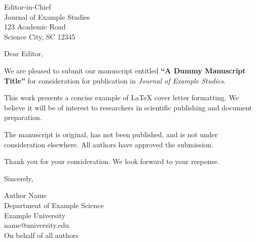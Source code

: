\documentclass[11pt]{letter}
\begin{document}
\begin{letter}{Editor-in-Chief\\Journal of Example Studies\\123 Academic Road\\Science City, SC 12345}

\opening{Dear Editor,}

We are pleased to submit our manuscript 
entitled \textbf{``A Dummy Manuscript Title''} for consideration for publication in 
\textit{Journal of Example Studies}.

This work presents a concise example of LaTeX cover letter formatting. We believe it will be of interest to researchers in scientific publishing and document preparation.

The manuscript is original, has not been published, and is not under consideration elsewhere. All authors have approved the submission.

Thank you for your consideration. We look forward to your response.

\closing{Sincerely,}

Author Name\\
Department of Example Science\\
Example University\\
name@university.edu\\
On behalf of all authors

\end{letter}
\end{document}
